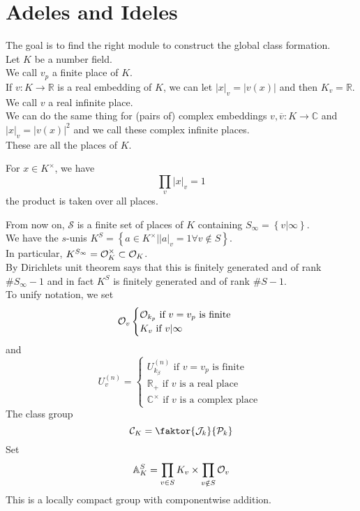 \documentclass[../main.tex]{subfiles}
\begin{document}
\section{Adeles and Ideles}
The goal is to find the right module to construct the global class formation.\\
Let $K$ be a number field.\\
We call $v_p$ a finite place of $K$.\\
If $v: K \to \mathbb{R}$ is a real embedding of $K$, we can let $|x|_v = |v( x) |$ and then $K_v = \mathbb{R}$.\\
We call $v$ a real infinite place.\\
We can do the same thing for (pairs of)  complex embeddings $v, \overline{v}: K \to \mathbb{C}$  and $|x|_v = |v( x) |^{2}$ and we call these complex infinite places.\\
These are all the places of $K$.
\begin{lemma}
For $x\in K^{\times}$, we have
\[ 
\prod_{v} |x|_v = 1 
\]
the product is taken over all places.
\end{lemma}
From now on, $ \mathcal{S}$ is a finite set of places of $K$ containing $S_{ \infty } = \left\{ v| \infty  \right\} $.\\
We have the $s$-unis $K^{S}= \left\{ a\in K^{\times}| |a|_v =1\forall v \notin S \right\} $.\\
In particular, $K^{S_{ \infty } }= \mathcal{O}_K^{\times} \subset \mathcal{O}_K$.\\
By Dirichlets unit theorem says that this is finitely generated and of rank $\# S_{ \infty } -1$ and in fact $K^{S}$ is finitely generated and of rank $\# S-1$.\\
To unify notation, we set 
\[ 
\mathcal{O}_v
\begin{cases}
\mathcal{O}_{k_p} \text{ if  } v=v_p \text{ is finite } \\
K_v \text{ if } v| \infty 
\end{cases}
\]
and
\[ 
U_v^{( n) } =
\begin{cases}
U_{k_\beta}^{( n) } \text{ if } v= v_p \text{ is finite } \\
\mathbb{R}_+ \text{ if $v$ is a real place } \\
\mathbb{C}^{\times} \text{ if } v \text{ is a complex place } 
\end{cases}
\]
The class group
\[ 
\mathcal{C}_K = \faktor{\mathcal{J}_k} { \mathcal{P}_k }
\]
Set
\[ 
\mathbb{A}^{S}_K= \prod_{v \in S} K_v \times \prod_{v\notin S} \mathcal{O}_v
\]
This is a locally compact group with componentwise addition.\\
\end{document}
